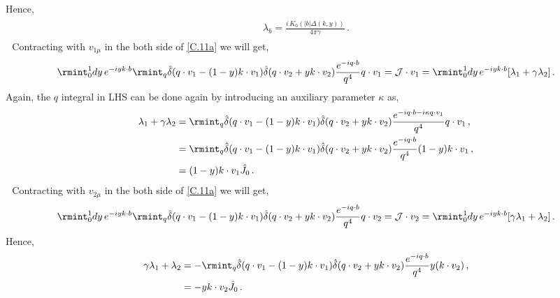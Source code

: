 Hence, 
\begin{align}
    \begin{split}
        \lambda_b=\frac{ i\, K_0(|b| \Delta(k,y) )}{4\pi\gamma }\,.
    \end{split}
\end{align}
 \textbullet $\,\,$ Contracting with $ v_{1\mu}$ in the both side of \eqref{C.11a} we will get,
\begin{align}
    \begin{split}
  \rmint_0^1 dy\,e^{-iyk\cdot b}\rmint_{q}\hat\delta(q\cdot v_1-(1-y)k\cdot v_1)\hat\delta(q\cdot v_2+yk\cdot v_2)\frac{e^{-iq\cdot b}}{q^4}q\cdot v_1=\mathcal{J}\cdot v_1=  \rmint_0^1 dy\,e^{-iyk\cdot b}[\lambda_1+\gamma \lambda_2]\,.
    \end{split}
\end{align}
Again, the $q$ integral in LHS can be done again by introducing an auxiliary parameter $\kappa$ as,
\begin{align}
    \begin{split} \label{B.16}
        \lambda_1+\gamma \lambda_2&=\rmint_{q}\hat\delta(q\cdot v_1-(1-y)k\cdot v_1)\hat\delta(q\cdot v_2+yk\cdot v_2)\frac{e^{-iq\cdot b-i \kappa q\cdot v_1}}{q^4}q\cdot v_1\,,\\ &
      =  \rmint_{q}\hat\delta(q\cdot v_1-(1-y)k\cdot v_1)\hat\delta(q\cdot v_2+yk\cdot v_2)\frac{e^{-iq\cdot b}}{q^4}(1-y)k\cdot v_1\,,\\ &
      =(1-y)k\cdot v_1 \hat J_0\,.
    \end{split}
\end{align}
 \textbullet $\,\,$ Contracting with $ v_{2\mu}$ in the both side of \eqref{C.11a} we will get,
\begin{align}
    \begin{split}
    \rmint_0^1 dy\,e^{-iyk\cdot b}\rmint_{q}\hat\delta(q\cdot v_1-(1-y)k\cdot v_1)\hat\delta(q\cdot v_2+yk\cdot v_2)\frac{e^{-iq\cdot b}}{q^4}q\cdot v_2=\mathcal{J}\cdot v_2=  \rmint_0^1 dy\,e^{-iyk\cdot b}[\gamma\lambda_1+\lambda_2]\,.
    \end{split}
\end{align}
Hence,
\begin{align}
    \begin{split} \label{B.18}
        \gamma \lambda_1+\lambda_2&=-\rmint_{q}\hat\delta(q\cdot v_1-(1-y)k\cdot v_1)\hat\delta(q\cdot v_2+yk\cdot v_2)\frac{e^{-iq\cdot b}}{q^4}y(k\cdot v_2)\,,\\ &
        =-y k\cdot v_2\hat J_0 \,.
    \end{split}
\end{align}
